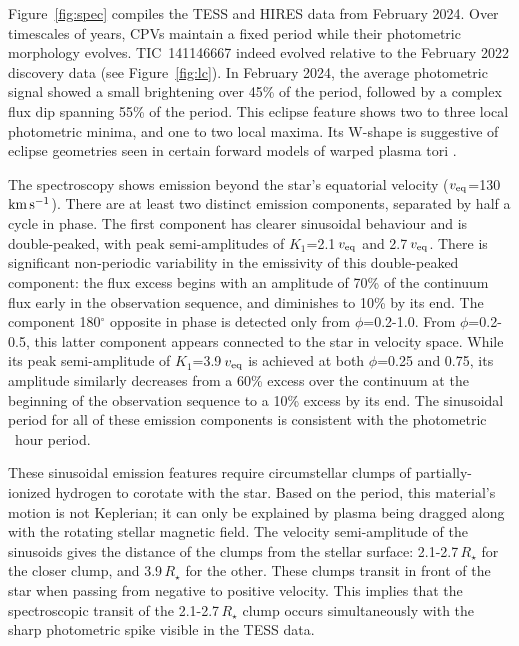 \documentclass{nature3}
\newcommand{\kms}{\ensuremath{\rm km\,s^{-1}}}
\begin{document}
Figure~\ref{fig:spec} compiles the TESS and HIRES data from February
2024.  Over timescales of years, CPVs maintain a fixed period while
their photometric morphology evolves.  TIC~141146667 indeed evolved
relative to the February 2022 discovery data (see Figure~\ref{fig:lc}).
In February 2024, the average photometric signal showed a small
brightening over 45\% of the period, followed by a complex flux dip
spanning 55\% of the period.  This eclipse feature shows two to three
local photometric minima, and one to two local maxima.  Its W-shape is
suggestive of eclipse geometries seen in certain forward models of warped
plasma tori \cite{Townsend2008}.

The spectroscopy shows emission beyond the star's equatorial velocity
($v_{\rm eq}$=130\,\kms).  There are at least two distinct emission
components, separated by half a cycle in phase.  The first component
has clearer sinusoidal behaviour and is double-peaked, with peak
semi-amplitudes of $K_1$=2.1\,$v_{\rm eq}$ and 2.7\,$v_{\rm eq}$.
There is significant non-periodic variability in the emissivity of
this double-peaked component: the flux excess begins with an amplitude
of 70\% of the continuum flux early in the observation sequence, and
diminishes to 10\% by its end.  The component 180$^\circ$ opposite in
phase is detected only from $\phi$=0.2-1.0.  From $\phi$=0.2-0.5, this
latter component appears connected to the star in velocity space.
While its peak semi-amplitude of $K_1$=3.9\,$v_{\rm eq}$ is achieved
at both $\phi$=0.25 and 0.75, its amplitude similarly decreases from a
60\% excess over the continuum at the beginning of the observation
sequence to a 10\% excess by its end.  The sinusoidal period for all
of these emission components is consistent with the photometric
\periodhr\ hour period.  

These sinusoidal emission features require circumstellar clumps of
partially-ionized hydrogen to corotate with the star.  
Based on the period, this material's motion is not Keplerian; it can
only be explained by plasma being dragged along with the rotating
stellar magnetic field. 
The velocity semi-amplitude of the sinusoids gives the distance
of the clumps from the stellar surface: 2.1-2.7\,$R_\star$ for the
closer clump, and 3.9\,$R_\star$ for the other.   These clumps transit
in front of the star when passing from negative to positive velocity.
This implies that the spectroscopic transit of the 2.1-2.7\,$R_\star$
clump occurs simultaneously with the sharp photometric spike visible
in the TESS data.
\end{document}
